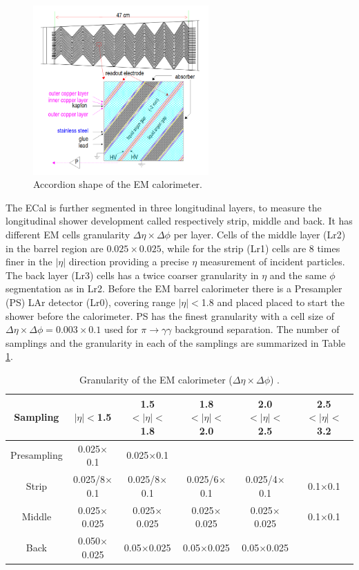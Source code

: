 \begin{figure}[ht]
    \centering
    \includegraphics[width=0.6\textwidth]{Ch2/Img/ECal_accord.png}
    \caption{Accordion shape of the EM calorimeter.}
    \label{fig:chap2:ATLAS:Calo:ECal:Acc}
\end{figure}
The ECal is further segmented in three longitudinal layers, to measure the longitudinal shower development called respectively strip, middle and back. It has different EM cells granularity $\Delta\eta\times\Delta\phi$ per layer. Cells of the middle layer (Lr2) in the barrel region are $0.025\times0.025$, while for the strip (Lr1) cells are 8 times finer in the $|\eta|$ direction providing a precise $\eta$ measurement of incident particles. The back layer (Lr3) cells has a twice coarser granularity in $\eta$ and the same $\phi$ segmentation as in Lr2. Before the EM barrel calorimeter there is a Presampler (PS) LAr detector (Lr0), covering range $|\eta|<$1.8 and placed placed to start the shower before the calorimeter. PS has the finest granularity with a cell size of $\Delta\eta\times\Delta\phi = 0.003\times0.1$ used for $\pi\rightarrow\gamma\gamma$ background separation. The number of samplings  and the granularity in each of the samplings are summarized in Table \ref{tab:chap2:ATLAS:Calo:ECal:Gr}.
\begin{table}[ht]
    \centering
    \begin{tabular}{cccccc}
    \hline
    Sampling & $|\eta|<$1.5 & 1.5$<|\eta|<$1.8 & 1.8$<|\eta|<$2.0 & 2.0$<|\eta|<$2.5 & 2.5$<|\eta|<$3.2 \\
    \hline
    \hline
        Presampling & 0.025$\times$0.1 & 0.025$\times$0.1  \\
        Strip & 0.025/8$\times$0.1 & 0.025/8$\times$0.1 & 0.025/6$\times$0.1 & 0.025/4$\times$0.1 & 0.1$\times$0.1 \\
        Middle & 0.025$\times$0.025 & 0.025$\times$0.025 & 0.025$\times$0.025 & 0.025$\times$0.025 & 0.1$\times$0.1 \\
        Back & 0.050$\times$0.025 & 0.05$\times$0.025 & 0.05$\times$0.025 & 0.05$\times$0.025 \\
        \hline
    \end{tabular}
    \caption{Granularity of the EM calorimeter ($\Delta\eta\times\Delta\phi$) \cite{LAr_TRD}.}
    \label{tab:chap2:ATLAS:Calo:ECal:Gr}
\end{table}
